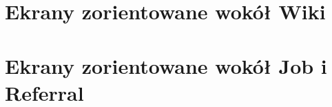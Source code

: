 \documentclass{scrreprt}
\begin{document}
\section{Ekrany zorientowane wokół Wiki}
\begin{center}
\end{center}

\section{Ekrany zorientowane wokół Job i Referral}
\begin{center}
\end{center}
\end{document}
